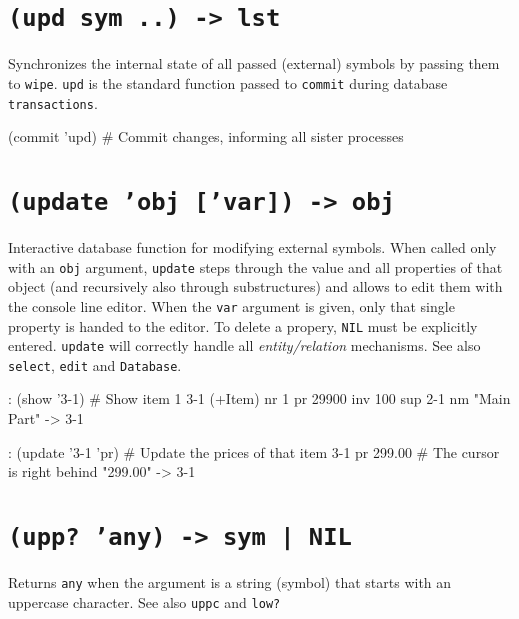  
\section*{\texttt{(upd sym ..) -> lst}}
\label{sec:func-ref-U-(upd sym ..) -> lst}


Synchronizes the internal state of all passed (external) symbols by
passing them to \texttt{wipe}. \texttt{upd} is the standard function passed to
\texttt{commit} during database \texttt{transactions}.


\begin{wideverbatim}
(commit 'upd)  # Commit changes, informing all sister processes
\end{wideverbatim}

 
\section*{\texttt{(update 'obj ['var]) -> obj}}
\label{sec:func-ref-U-(update 'obj ['var]) -> obj}


Interactive database function for modifying external symbols. When
called only with an \texttt{obj} argument, \texttt{update} steps through the value and
all properties of that object (and recursively also through
substructures) and allows to edit them with the console line editor.
When the \texttt{var} argument is given, only that single property is handed to
the editor. To delete a propery, \texttt{NIL} must be explicitly entered.
\texttt{update} will correctly handle all \emph{entity/relation}
mechanisms. See also \texttt{select}, \texttt{edit} and \texttt{Database}.


\begin{wideverbatim}
: (show '{3-1})            # Show item 1
{3-1} (+Item)
   nr 1
   pr 29900
   inv 100
   sup {2-1}
   nm "Main Part"
-> {3-1}

: (update '{3-1} 'pr)      # Update the prices of that item
{3-1} pr 299.00            # The cursor is right behind "299.00"
-> {3-1}
\end{wideverbatim}

 
\section*{\texttt{(upp? 'any) -> sym | NIL}}
\label{sec:func-ref-U-(upp? 'any) -> sym | NIL}


Returns \texttt{any} when the argument is a string (symbol) that starts with an
uppercase character. See also \texttt{uppc} and \texttt{low?}


